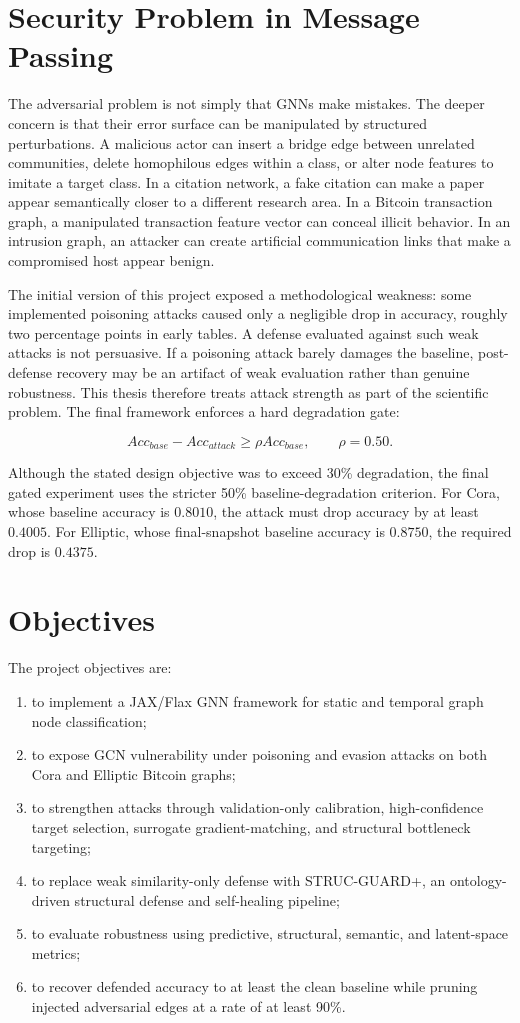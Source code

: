 \documentclass[12pt,oneside]{report}
\begin{document}
\section{Security Problem in Message Passing}
The adversarial problem is not simply that GNNs make mistakes. The deeper concern is that their error surface can be manipulated by structured perturbations. A malicious actor can insert a bridge edge between unrelated communities, delete homophilous edges within a class, or alter node features to imitate a target class. In a citation network, a fake citation can make a paper appear semantically closer to a different research area. In a Bitcoin transaction graph, a manipulated transaction feature vector can conceal illicit behavior. In an intrusion graph, an attacker can create artificial communication links that make a compromised host appear benign.

The initial version of this project exposed a methodological weakness: some implemented poisoning attacks caused only a negligible drop in accuracy, roughly two percentage points in early tables. A defense evaluated against such weak attacks is not persuasive. If a poisoning attack barely damages the baseline, post-defense recovery may be an artifact of weak evaluation rather than genuine robustness. This thesis therefore treats attack strength as part of the scientific problem. The final framework enforces a hard degradation gate:

$$
Acc_{base}-Acc_{attack}\geq \rho Acc_{base},\qquad \rho=0.50.
$$

Although the stated design objective was to exceed 30\% degradation, the final gated experiment uses the stricter 50\% baseline-degradation criterion. For Cora, whose baseline accuracy is $0.8010$, the attack must drop accuracy by at least $0.4005$. For Elliptic, whose final-snapshot baseline accuracy is $0.8750$, the required drop is $0.4375$.

\section{Objectives}
The project objectives are:
\begin{enumerate}
    \item to implement a JAX/Flax GNN framework for static and temporal graph node classification;
    \item to expose GCN vulnerability under poisoning and evasion attacks on both Cora and Elliptic Bitcoin graphs;
    \item to strengthen attacks through validation-only calibration, high-confidence target selection, surrogate gradient-matching, and structural bottleneck targeting;
    \item to replace weak similarity-only defense with STRUC-GUARD+, an ontology-driven structural defense and self-healing pipeline;
    \item to evaluate robustness using predictive, structural, semantic, and latent-space metrics;
    \item to recover defended accuracy to at least the clean baseline while pruning injected adversarial edges at a rate of at least 90\%.
\end{enumerate}
\end{document}
